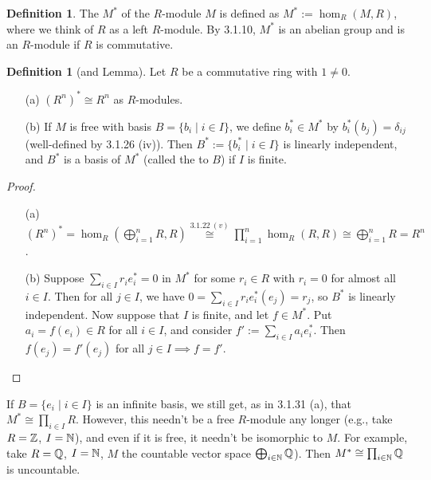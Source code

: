 \documentclass[11pt]{book}
\theoremstyle{definition}   \newtheorem{defn}[counter]{Definition} %
\newcommand{\vs}{\vspace{8pt}}
\numberwithin{counter}{chapter}
\begin{document}
\vs

\begin{defn}
The  $M^*$ of the $R$-module $M$ is defined as $M^* := \hom_R(M,R)$, where we think of $R$ as a left $R$-module. By 3.1.10, $M^*$ is an abelian group and is an $R$-module if $R$ is commutative. 
\end{defn}

\vs

\begin{defn}[and Lemma]
Let $R$ be a commutative ring with $1 \ne 0$. 
\begin{enumerate}
\item[(a)] $(R^n)^* \cong R^n$ as $R$-modules. 
\item[(b)] If $M$ is free with basis $B = \{b_i \mid i \in I\}$, we define $b_i^* \in M^*$ by $b_i^*(b_j) = \delta_{ij}$ (well-defined by 3.1.26 (iv)). Then $B^* := \{b_i^* \mid i \in I\}$ is linearly independent, and $B^*$ is a basis of $M^*$ (called the  to $B$) if $I$ is finite.
\end{enumerate}
\end{defn}

\begin{proof}
\begin{enumerate}\ 
\item[(a)] $(R^n)^* = \hom_R\left(\bigoplus_{i=1}^n R, R\right) \overset{3.1.22 \ (v)}{\cong} \prod_{i=1}^n \hom_R(R,R) \cong \bigoplus_{i=1}^n R = R^n$.

\item[(b)] Suppose $\sum_{i \in I} r_i e_{i}^* = 0$ in $M^*$ for some $r_i \in R$ with $r_i = 0$ for almost all $i \in I$. Then for all $j \in I$, we have $0 = \sum_{i \in I} r_i e_i^*(e_j) = r_j$, so $B^*$ is linearly independent. Now suppose that $I$ is finite, and let $f \in M^*$. Put $a_i = f(e_i) \in R$ for all $i \in I$, and consider $f':= \sum_{i \in I} a_i e_i^*$. Then $f(e_j) = f'(e_j)$ for all $j \in I \implies f = f'$. 
\end{enumerate}
\end{proof}

\vs

\begin{remark}
If $B = \{e_i \mid i \in I \}$ is an infinite basis, we still get, as in 3.1.31 (a), that $M^* \cong \prod_{i \in I} R$. However, this needn't be a free $R$-module any longer (e.g., take $R = \operatorname{\mathbb{Z}}$, $I = \operatorname{\mathbb{N}}$), and even if it is free, it needn't be isomorphic to $M$. For example, take $R = \operatorname{\mathbb{Q}}$, $I = \operatorname{\mathbb{N}}$, $M$ the countable vector space $\bigoplus_{i \in \operatorname{\mathbb{N}}} \operatorname{\mathbb{Q}}$). Then $M^* \cong \prod_{i \in \operatorname{\mathbb{N}}} \operatorname{\mathbb{Q}}$ is uncountable. 
\end{remark}
\end{document}
